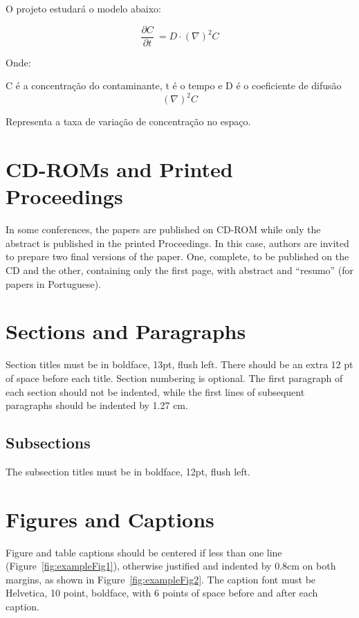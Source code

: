 \documentclass[12pt]{article}
\begin{document}
O projeto estudará o modelo abaixo:

  \[\frac{\partial C}{\partial t}\ = D \cdot (\nabla)^{2} C \]

Onde:
    
        C é a concentração do contaminante,
        t é o tempo e 
        D é o coeficiente de difusão
        \[(\nabla)^{2} C\]
    
    Representa a taxa de variação de concentração no espaço.


\section{CD-ROMs and Printed Proceedings}

In some conferences, the papers are published on CD-ROM while only the
abstract is published in the printed Proceedings. In this case, authors are
invited to prepare two final versions of the paper. One, complete, to be
published on the CD and the other, containing only the first page, with
abstract and ``resumo'' (for papers in Portuguese).

\section{Sections and Paragraphs}

Section titles must be in boldface, 13pt, flush left. There should be an extra
12 pt of space before each title. Section numbering is optional. The first
paragraph of each section should not be indented, while the first lines of
subsequent paragraphs should be indented by 1.27 cm.

\subsection{Subsections}

The subsection titles must be in boldface, 12pt, flush left.

\section{Figures and Captions}\label{sec:figs}


Figure and table captions should be centered if less than one line
(Figure~\ref{fig:exampleFig1}), otherwise justified and indented by 0.8cm on
both margins, as shown in Figure~\ref{fig:exampleFig2}. The caption font must
be Helvetica, 10 point, boldface, with 6 points of space before and after each
caption.
\end{document}
